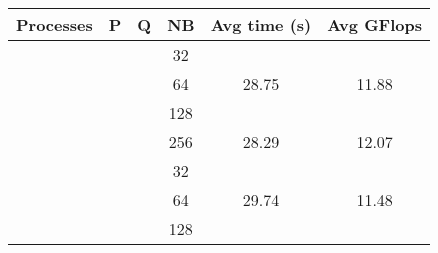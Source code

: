 \begin{longtable}{cccccc}
Processes             & P                                                                  & Q                                                                  & NB                                              & {  Avg time (s)}                     & {  Avg GFlops}                       \\ \hline \hline 
                      & \cellcolor[HTML]{EFEFEF}{  }                    & \cellcolor[HTML]{EFEFEF}{  }                    & \cellcolor[HTML]{EFEFEF}32                      & \cellcolor[HTML]{EFEFEF}{  32.95}    & \cellcolor[HTML]{EFEFEF}{  10.36}    \\
                      & \cellcolor[HTML]{EFEFEF}{  }                    & \cellcolor[HTML]{EFEFEF}{  }                    & 64                                              & {  28.75}                            & {  11.88}                            \\
                      & \cellcolor[HTML]{EFEFEF}{  }                    & \cellcolor[HTML]{EFEFEF}{  }                    & \cellcolor[HTML]{EFEFEF}128                     & \cellcolor[HTML]{EFEFEF}{  27.94}    & \cellcolor[HTML]{EFEFEF}{  12.22}    \\
                      & \multirow{-4}{*}{\cellcolor[HTML]{EFEFEF}{  1}} & \multirow{-4}{*}{\cellcolor[HTML]{EFEFEF}{  2}} & 256                                             & {  28.29}                            & {  12.07}                            \\ \cline{2-6}
                      & {  }                                            & {  }                                            & \cellcolor[HTML]{EFEFEF}32                      & \cellcolor[HTML]{EFEFEF}{  33.74}    & \cellcolor[HTML]{EFEFEF}{  10.12}    \\
                      & {  }                                            & {  }                                            & 64                                              & {  29.74}                            & {  11.48}                            \\
                      & {  }                                            & {  }                                            & \cellcolor[HTML]{EFEFEF}128                     & \cellcolor[HTML]{EFEFEF}{  28.52}    & \cellcolor[HTML]{EFEFEF}{  11.97}    \\

\end{longtable}
